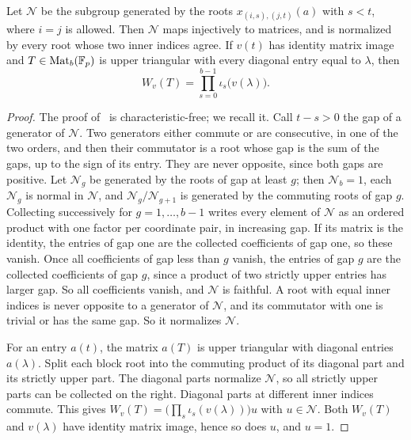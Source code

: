 \begin{lemma}
\label{lem:tor-triangular}
Let $\mathcal N$ be the subgroup generated by the roots $x_{(i,s),(j,t)}(a)$ with $s<t$, where $i=j$ is allowed. Then
$\mathcal N$ maps injectively to matrices, and is normalized by every root whose two inner indices agree. If $v(t)$ has
identity matrix image and $T\in\operatorname{Mat}_b(\mathbb F_p)$ is upper triangular with every diagonal entry equal to $\lambda$, then
\[
 W_v(T)=\prod_{s=0}^{b-1}\iota_s\bigl(v(\lambda)\bigr).
\]
\end{lemma}

\begin{proof}
The proof of~\cite{OAI247rf} is characteristic-free; we recall it. Call $t-s>0$ the gap of a generator of $\mathcal N$.
Two generators either commute or are consecutive, in one of the two orders, and then their commutator is a root whose gap
is the sum of the gaps, up to the sign of its entry. They are never opposite, since both gaps are positive. Let
$\mathcal N_g$ be generated by the roots of gap at least $g$; then $\mathcal N_b=1$, each $\mathcal N_g$ is normal in
$\mathcal N$, and $\mathcal N_g/\mathcal N_{g+1}$ is generated by the commuting roots of gap $g$. Collecting
successively for $g=1,\dots,b-1$ writes every element of $\mathcal N$ as an ordered product with one factor per
coordinate pair, in increasing gap. If its matrix is the identity, the entries of gap one are the collected coefficients
of gap one, so these vanish. Once all coefficients of gap less than $g$ vanish, the entries of gap $g$ are the collected
coefficients of gap $g$, since a product of two strictly upper entries has larger gap. So all coefficients vanish, and
$\mathcal N$ is faithful. A root with equal inner indices is never opposite to a generator of $\mathcal N$, and its
commutator with one is trivial or has the same gap. So it normalizes $\mathcal N$.

For an entry $a(t)$, the matrix $a(T)$ is upper triangular with diagonal entries $a(\lambda)$. Split each block root into
the commuting product of its diagonal part and its strictly upper part. The diagonal parts normalize $\mathcal N$, so all
strictly upper parts can be collected on the right. Diagonal parts at different inner indices commute. This gives
$W_v(T)=\bigl(\prod_s\iota_s(v(\lambda))\bigr)u$ with $u\in\mathcal N$. Both $W_v(T)$ and $v(\lambda)$ have identity
matrix image, hence so does $u$, and $u=1$.
\end{proof}

